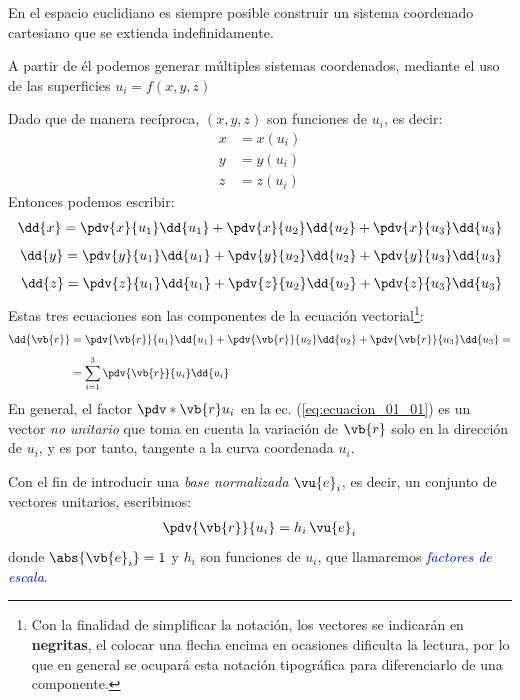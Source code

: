 En el espacio euclidiano es siempre posible construir un sistema coordenado cartesiano que se extienda indefinidamente.
\par
A partir de él podemos generar múltiples sistemas coordenados, mediante el uso de las superficies $u_{i} = f(x, y, z)$
\par
Dado que de manera recíproca, $(x, y, z)$ son funciones de $u_{i}$, es decir:
\begin{align*}
x &= x(u_{i}) \\
y &= y(u_{i}) \\
z &= z(u_{i})
\end{align*}
Entonces podemos escribir:
\begin{align*}
\dd{x} = \pdv{x}{u_{1}} \dd{u_{1}} + \pdv{x}{u_{2}} \dd{u_{2}} + \pdv{x}{u_{3}} \dd{u_{3}} \\[0.5em]
\dd{y} = \pdv{y}{u_{1}} \dd{u_{1}} + \pdv{y}{u_{2}} \dd{u_{2}} + \pdv{y}{u_{3}} \dd{u_{3}} \\[0.5em]
\dd{z} = \pdv{z}{u_{1}} \dd{u_{1}} + \pdv{z}{u_{2}} \dd{u_{2}} + \pdv{z}{u_{3}} \dd{u_{3}}
\end{align*}
Estas tres ecuaciones son las componentes de la ecuación vectorial\footnote{Con la finalidad de simplificar la notación, los vectores se indicarán en \textbf{negritas}, el colocar una flecha encima en ocasiones dificulta la lectura, por lo que en general se ocupará esta notación tipográfica para diferenciarlo de una componente.}:
\begin{align}
\begin{aligned}
\dd{\vb{r}} &= \pdv{\vb{r}}{u_{1}} \dd{u_{1}} + \pdv{\vb{r}}{u_{2}} \dd{u_{2}} + \pdv{\vb{r}}{u_{3}} \dd{u_{3}} = \\[0.5em]
&= \sum_{i=1}^{3} \pdv{\vb{r}}{u_{i}} \dd{u_{i}}
\end{aligned}
\label{eq:ecuacion_01_01}
\end{align}
En general, el factor $\pdv*{\vb{r}}{u_{i}}$ en la ec. (\ref{eq:ecuacion_01_01}) es un vector \emph{no unitario} que toma en cuenta la variación de $\vb{r}$ solo en la dirección de $u_{i}$, y es por tanto, tangente a la curva coordenada $u_{i}$.
\par
Con el fin de introducir una \emph{base normalizada} $\vu{e}_{i}$, es decir, un conjunto de vectores unitarios, escribimos:
\begin{align}
\pdv{\vb{r}}{u_{i}} = h_{i} \, \vu{e}_{i}
\label{eq:ecuacion_01_02}
\end{align}
donde $\abs{\vb{e}_{i}} = 1$ y $h_{i}$ son funciones de $u_{i}$, que llamaremos \emph{\textcolor{blue}{factores de escala}}.
